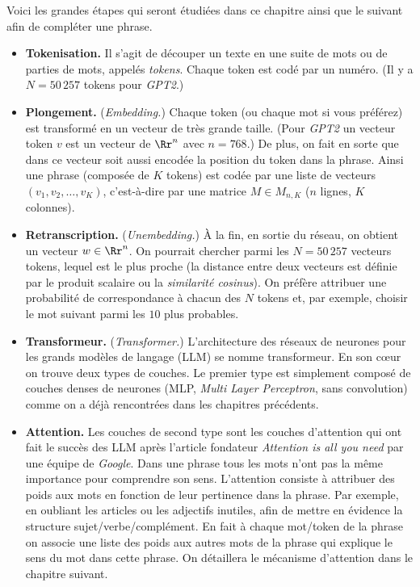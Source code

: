 \documentclass[11pt,class=report,crop=false]{standalone}
\begin{document}
Voici les grandes étapes qui seront étudiées dans ce chapitre ainsi que le suivant afin de compléter une phrase.

\begin{itemize}
	\item \textbf{Tokenisation.} 
	Il s'agit de découper un texte en une suite de mots ou de parties de mots, appelés \emph{tokens}. Chaque token est codé par un numéro. (Il y a $N=50\,257$ tokens pour \emph{GPT2}.)
	
	\item \textbf{Plongement.} (\emph{Embedding.})
	Chaque token (ou chaque mot si vous préférez) est transformé en un vecteur de très grande taille. (Pour \emph{GPT2} un vecteur token $v$ est un vecteur de  $\Rr^n$ avec $n=768$.) De plus, on fait en sorte que dans ce vecteur soit aussi encodée la position du token dans la phrase.
	Ainsi une phrase (composée de $K$ tokens) est codée par une liste de vecteurs $(v_1,v_2,\ldots,v_K)$,	c'est-à-dire par une matrice $M \in M_{n,K}$ ($n$ lignes, $K$ colonnes).
	
	\item \textbf{Retranscription.} (\emph{Unembedding.})
	À la fin, en sortie du réseau, on obtient un vecteur $w \in \Rr^n$. On pourrait chercher parmi les $N= 50\,257$ vecteurs tokens, lequel est le plus proche (la distance entre deux vecteurs est définie par le produit scalaire ou la \emph{similarité cosinus}). On préfère attribuer une probabilité de correspondance à chacun des $N$ tokens et, par exemple, choisir le mot suivant parmi les $10$ plus probables.
	
	\item \textbf{Transformeur.} (\emph{Transformer.}) L'architecture des réseaux de neurones pour les grands modèles de langage (LLM) se nomme transformeur. En son c\oe ur on trouve deux types de couches. Le premier type est simplement composé de couches denses de neurones (MLP, \emph{Multi Layer Perceptron}, sans convolution) comme on a déjà rencontrées dans les chapitres précédents. 
	
	\item \textbf{Attention.} 
	Les couches de second type sont les couches d'attention qui ont fait le succès des LLM après l'article fondateur \emph{Attention is all you need} par une équipe de \emph{Google}. 
	Dans une phrase tous les mots n'ont pas la même importance pour comprendre son sens. L'attention consiste à attribuer des poids aux mots en fonction de leur pertinence dans la phrase. Par exemple, en oubliant les articles ou les adjectifs inutiles, afin de mettre en évidence la structure sujet/verbe/complément.
	En fait à chaque mot/token de la phrase on associe une liste des poids aux autres mots de la phrase qui explique le sens du mot dans cette phrase. 	
	On détaillera le mécanisme d'attention dans le chapitre suivant.
	

\end{itemize}
\end{document}
